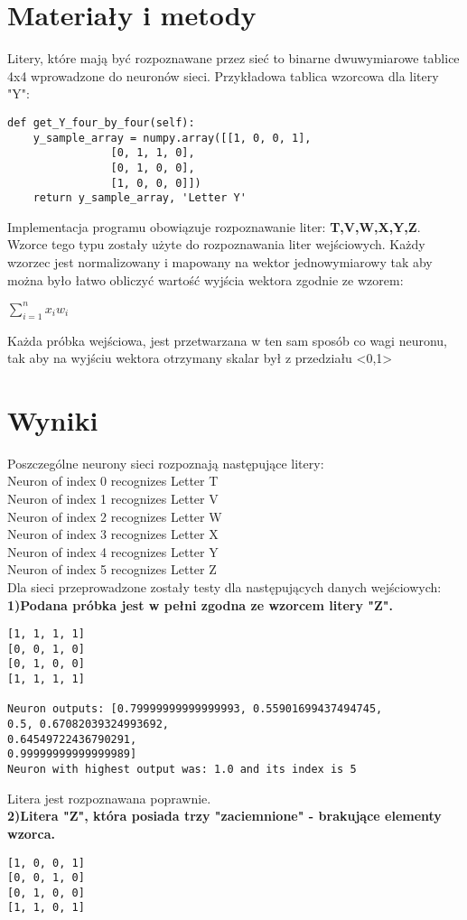 \documentclass{classrep}
\begin{document}
\section{Materiały i metody}
{Litery, które mają być rozpoznawane przez sieć to binarne dwuwymiarowe tablice 4x4 wprowadzone do neuronów sieci. Przykładowa tablica wzorcowa dla litery "Y":
\begin{lstlisting}
def get_Y_four_by_four(self):
	y_sample_array = numpy.array([[1, 0, 0, 1],
				[0, 1, 1, 0],
				[0, 1, 0, 0],
				[1, 0, 0, 0]])
	return y_sample_array, 'Letter Y'
\end{lstlisting}
Implementacja programu obowiązuje rozpoznawanie liter: \textbf{T,V,W,X,Y,Z}. Wzorce tego typu zostały użyte do rozpoznawania liter wejściowych. Każdy wzorzec jest normalizowany i mapowany na wektor jednowymiarowy tak aby można było łatwo obliczyć wartość wyjścia wektora zgodnie ze wzorem:
\begin{center}$\sum_{i=1}^{n} x_iw_i$\end{center}

Każda próbka wejściowa, jest przetwarzana w ten sam sposób co wagi neuronu, tak aby na wyjściu wektora otrzymany skalar był z przedziału <0,1> 
\section{Wyniki}
{Poszczególne neurony sieci rozpoznają następujące litery:
\\Neuron of index 0 recognizes Letter T
\\Neuron of index 1 recognizes Letter V
\\Neuron of index 2 recognizes Letter W
\\Neuron of index 3 recognizes Letter X
\\Neuron of index 4 recognizes Letter Y
\\Neuron of index 5 recognizes Letter Z
\\Dla sieci przeprowadzone zostały testy dla następujących danych wejściowych:\\
\textbf{1)Podana próbka jest w pełni zgodna ze wzorcem litery "Z".}
\begin{lstlisting}
[1, 1, 1, 1]
[0, 0, 1, 0]
[0, 1, 0, 0]
[1, 1, 1, 1]

Neuron outputs: [0.79999999999999993, 0.55901699437494745,
0.5, 0.67082039324993692,
0.64549722436790291,
0.99999999999999989]
Neuron with highest output was: 1.0 and its index is 5
\end{lstlisting}
Litera jest rozpoznawana poprawnie.
\\
\textbf{2)Litera "Z", która posiada trzy "zaciemnione" - brakujące elementy wzorca.}  
\begin{lstlisting}
[1, 0, 0, 1]
[0, 0, 1, 0]
[0, 1, 0, 0]
[1, 1, 0, 1]


\end{lstlisting}}}
\end{document}

